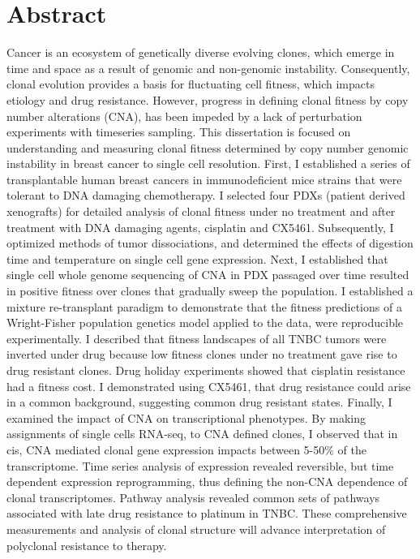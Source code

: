 
\chapter{Abstract}
Cancer is an ecosystem of genetically diverse evolving clones, which emerge in time and space as a result of genomic and non-genomic instability. Consequently, clonal evolution provides a basis for fluctuating cell fitness, which impacts etiology and drug resistance. However, progress in defining clonal fitness by copy number alterations (CNA), has been impeded by a lack of perturbation experiments with timeseries sampling. This dissertation is focused on understanding and measuring clonal fitness determined by copy number genomic instability in breast cancer to single cell resolution. First, I established a series of transplantable human breast cancers in immunodeficient mice strains that were tolerant to DNA damaging chemotherapy. I selected four PDXs (patient derived xenografts) for detailed analysis of clonal fitness under no treatment and after treatment with DNA damaging agents, cisplatin and CX5461. Subsequently, I optimized methods of tumor dissociations, and determined the effects of digestion time and temperature on single cell gene expression. Next, I established that single cell whole genome sequencing of CNA in PDX passaged over time resulted in positive fitness over clones that gradually sweep the population. I established a mixture re-transplant paradigm to demonstrate that the fitness predictions of a Wright-Fisher population genetics model applied to the data, were reproducible experimentally.  I described that fitness landscapes of all TNBC tumors were inverted under drug because low fitness clones under no treatment gave rise to drug resistant clones. Drug holiday experiments showed that cisplatin resistance had a fitness cost. I demonstrated using CX5461, that drug resistance could arise in a common background, suggesting common drug resistant states. Finally, I examined the impact of CNA on transcriptional phenotypes. By making assignments of single cells RNA-seq, to CNA defined clones, I observed that in cis, CNA mediated clonal gene expression impacts between 5-50\% of the transcriptome. Time series analysis of expression revealed reversible, but time dependent expression reprogramming, thus defining the non-CNA dependence of clonal transcriptomes. Pathway analysis revealed common sets of pathways associated with late drug resistance to platinum in TNBC. 
These comprehensive measurements and analysis of clonal structure will advance interpretation of polyclonal resistance to therapy.










